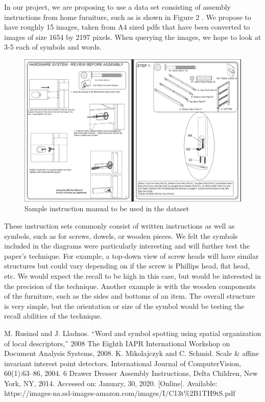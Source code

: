 \documentclass[conference]{IEEEtran}
\begin{document}
In our project, we are proposing to use a data set consisting of assembly instructions from home furniture, such as is shown in Figure 2 \cite{b3}. We propose to have roughly 15 images, taken from A4 sized pdfs that have been converted to images of size 1654 by 2197 pixels. When querying the images, we hope to look at 3-5 each of symbols and words.

\begin{figure}[htbp]
	\centerline{\includegraphics[width=0.9\columnwidth]{fig2.png}}
	\caption{Sample instruction manual to be used in the dataset \cite{b3}}
	\label{Figure 2}
\end{figure}

These instruction sets commonly consist of written instructions as well as symbols, such as for screws, dowels, or wooden pieces. We felt the symbols included in the diagrams were particularly interesting and will further test the paper's technique. For example, a top-down view of screw heads will have similar structures but could vary depending on if the screw is Phillips head, flat head, etc. We would expect the recall to be high in this case, but would be interested in the precision of the technique. Another example is with the wooden components of the furniture, such as the sides and bottoms of an item. The overall structure is very simple, but the orientation or size of the symbol would be testing the recall abilities of the technique.

\begin{thebibliography}{00}
 M. Rusinol and J. Lladnos. ``Word and symbol spotting using spatial organization of local descriptors,'' 2008 The Eighth IAPR International Workshop on Document Analysis Systems, 2008.
 K. Mikolajczyk and C. Schmid. Scale \& affine invariant interest point detectors. International Journal of ComputerVision, 60(1):63–86, 2004.
 6 Drawer Dresser Assembly Instructions, Delta Children, New York, NY, 2014. Accessed on: January, 30, 2020. [Online]. Available: https://images-na.ssl-images-amazon.com/images/I/C13t\%2B1TH9tS.pdf
\end{thebibliography}
\end{document}
